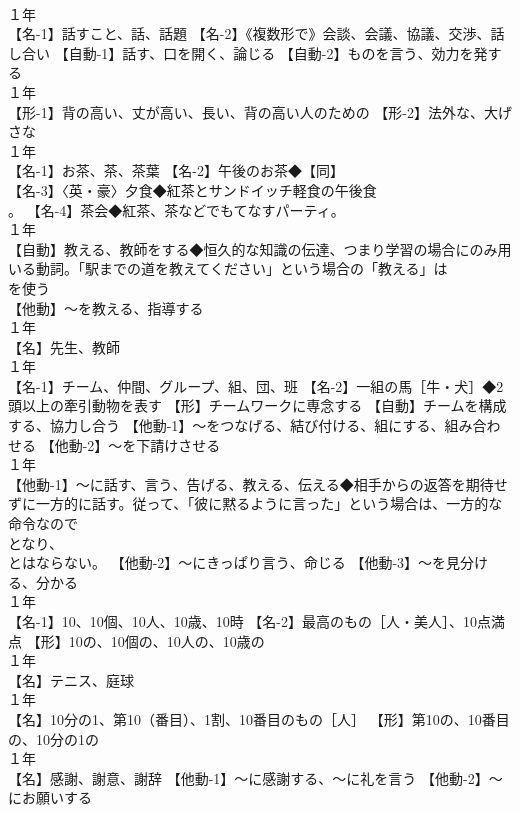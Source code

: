 \documentclass[8pt]{extreport}
\begin{document}
\begin{CJK}{UTF8}{min}
\\	１年	
\\	【名-1】話すこと、話、話題 【名-2】《複数形で》会談、会議、協議、交渉、話し合い 【自動-1】話す、口を開く、論じる 【自動-2】ものを言う、効力を発する
\\	１年	
\\	【形-1】背の高い、丈が高い、長い、背の高い人のための 【形-2】法外な、大げさな
\\	１年	
\\	【名-1】お茶、茶、茶葉 【名-2】午後のお茶◆【同】
\\	【名-3】〈英・豪〉夕食◆紅茶とサンドイッチ軽食の午後食
\\	。 【名-4】茶会◆紅茶、茶などでもてなすパーティ。
\\	１年	
\\	【自動】教える、教師をする◆恒久的な知識の伝達、つまり学習の場合にのみ用いる動詞。「駅までの道を教えてください」という場合の「教える」は 
\\	を使う
\\	【他動】～を教える、指導する
\\	１年	
\\	【名】先生、教師
\\	１年	
\\	【名-1】チーム、仲間、グループ、組、団、班 【名-2】一組の馬［牛・犬］◆2頭以上の牽引動物を表す 【形】チームワークに専念する 【自動】チームを構成する、協力し合う 【他動-1】～をつなげる、結び付ける、組にする、組み合わせる 【他動-2】～を下請けさせる
\\	１年	
\\	【他動-1】～に話す、言う、告げる、教える、伝える◆相手からの返答を期待せずに一方的に話す。従って、「彼に黙るように言った」という場合は、一方的な命令なので 
\\	となり、
\\	とはならない。 【他動-2】～にきっぱり言う、命じる 【他動-3】～を見分ける、分かる
\\	１年	
\\	【名-1】10、10個、10人、10歳、10時 【名-2】最高のもの［人・美人］、10点満点 【形】10の、10個の、10人の、10歳の
\\	１年	
\\	【名】テニス、庭球
\\	１年	
\\	【名】10分の1、第10（番目）、1割、10番目のもの［人］ 【形】第10の、10番目の、10分の1の
\\	１年	
\\	【名】感謝、謝意、謝辞 【他動-1】～に感謝する、～に礼を言う 【他動-2】～にお願いする

\end{CJK}
\end{document}

